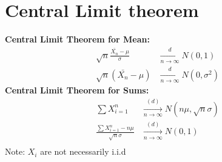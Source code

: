 \section{Central Limit theorem}
\textbf{Central Limit Theorem for Mean:}
\begin{align*}
\sqrt{n}\frac{\bar{X_n}-\mu}{\sigma}& \xrightarrow[n \rightarrow \infty]{d} N(0,1)\\
\sqrt{n}(\bar{X_n}-\mu)& \xrightarrow[n \rightarrow \infty]{d} N(0,\sigma^2)
\end{align*}
\textbf{Central Limit Theorem for Sums:} \\
\begin{align*}
\sum{X}_{i=1}^{n} & \xrightarrow[n \rightarrow \infty]{(d)} N(n \mu, \sqrt{n}\sigma)\\
\frac{\sum{X}_{i=1}^{n} - n\mu}{\sqrt{n}\sigma} & \xrightarrow[n \rightarrow \infty]{(d)} N(0, 1)\\
\end{align*}
Note: $X_{i}$ are not necessarily i.i.d \\
